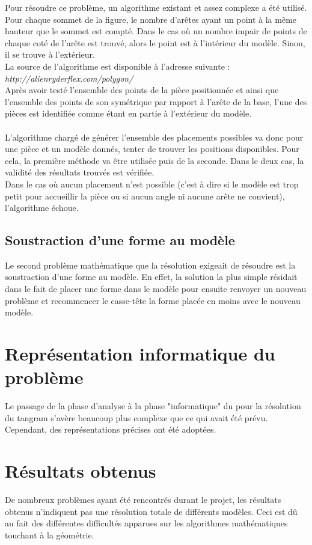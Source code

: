 \documentclass[a4paper, 11pt]{report}
\begin{document}
    Pour résoudre ce problème, un algorithme existant et assez complexe a été utilisé. Pour chaque sommet de la figure, le nombre d'arêtes ayant un point à la même hauteur que le sommet est compté. Dans le cas où un nombre impair de points de chaque coté de l'arête est trouvé, alors le point est à l'intérieur du modèle. Sinon, il se trouve à l'extérieur.\\
    La source de l'algorithme est disponible à l'adresse suivante : \emph{http://alienryderflex.com/polygon/}\\ 

    Après avoir testé l'ensemble des points de la pièce positionnée et ainsi que l'ensemble des points de son symétrique par rapport à l'arête de la base, l'une des pièces est identifiée comme étant en partie à l'extérieur du modèle.\\ \ \\

    L'algorithme chargé de générer l'ensemble des placements possibles va donc pour une pièce et un modèle donnés, tenter de trouver les positions disponibles. Pour cela, la première méthode va être utilisée puis de la seconde. Dans le deux cas, la validité des résultats trouvés est vérifiée.\\
    Dans le cas où aucun placement n'est possible (c'est à dire si le modèle est trop petit pour accueillir la pièce ou si aucun angle ni aucune arête ne convient), l'algorithme échoue.
	
		\section{Soustraction d'une forme au modèle}
		
		Le second problème mathématique que la résolution exigeait de résoudre est la soustraction d'une forme au modèle. En effet, la solution la plus simple résidait dans le fait de placer une forme dans le modèle pour ensuite renvoyer un nouveau problème et recommencer le casse-t\^ete la forme placée en moins avec le nouveau modèle.
	
	
	\newpage
	
	\chapter{Représentation informatique du problème}
	
	Le passage de la phase d'analyse à la phase "informatique" du pour la résolution du tangram s'avère beaucoup plus complexe que ce qui avait été prévu. Cependant, des représentations précises ont été adoptées.
	
	\chapter{Résultats obtenus}
	
	De nombreux problèmes ayant été rencontrés durant le projet, les résultats obtenus n'indiquent pas une résolution totale de différents modèles. Ceci est d\^u au fait des différentes difficultés apparues sur les algorithmes mathématiques touchant à la géométrie.
	
	
		
	\newpage	
		
	\tableofcontents
		
\end{document}
